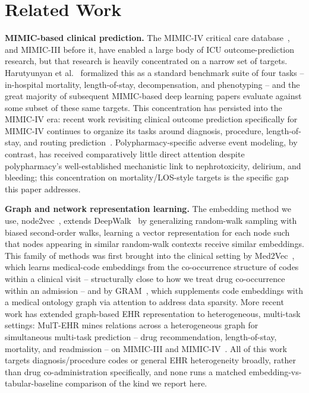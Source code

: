 \documentclass[conference]{IEEEtran}
\begin{document}
\section{Related Work}

\textbf{MIMIC-based clinical prediction.} The MIMIC-IV critical care
database~\cite{johnson2023mimiciv}, and MIMIC-III before it, have enabled a
large body of ICU outcome-prediction research, but that research is heavily
concentrated on a narrow set of targets.
Harutyunyan et al.~\cite{harutyunyan2019benchmarking} formalized this as a
standard benchmark suite of four tasks -- in-hospital mortality,
length-of-stay, decompensation, and phenotyping -- and the great majority of
subsequent MIMIC-based deep learning papers evaluate against some subset of
these same targets. This concentration has persisted into the MIMIC-IV era:
recent work revisiting clinical outcome prediction specifically for MIMIC-IV
continues to organize its tasks around diagnosis, procedure, length-of-stay,
and routing prediction~\cite{rohr2024revisiting}. Polypharmacy-specific
adverse event modeling, by contrast, has received comparatively little
direct attention despite polypharmacy's well-established mechanistic link to
nephrotoxicity, delirium, and bleeding; this concentration on
mortality/LOS-style targets is the specific gap this paper addresses.

\textbf{Graph and network representation learning.} The embedding method we
use, node2vec~\cite{grover2016node2vec}, extends
DeepWalk~\cite{perozzi2014deepwalk} by generalizing random-walk sampling
with biased second-order walks, learning a vector representation for each
node such that nodes appearing in similar random-walk contexts receive
similar embeddings. This family of methods was first brought into the
clinical setting by Med2Vec~\cite{choi2016med2vec}, which learns
medical-code embeddings from the co-occurrence structure of codes within a
clinical visit -- structurally close to how we treat drug co-occurrence
within an admission -- and by GRAM~\cite{choi2017gram}, which supplements
code embeddings with a medical ontology graph via attention to address data
sparsity. More recent work has extended graph-based EHR representation to
heterogeneous, multi-task settings: MulT-EHR mines relations across a
heterogeneous graph for simultaneous multi-task prediction -- drug
recommendation, length-of-stay, mortality, and readmission -- on MIMIC-III
and MIMIC-IV~\cite{chan2024multehr}. All of this work targets
diagnosis/procedure codes or general EHR heterogeneity broadly, rather than
drug co-administration specifically, and none runs a matched
embedding-vs-tabular-baseline comparison of the kind we report here.
\end{document}
